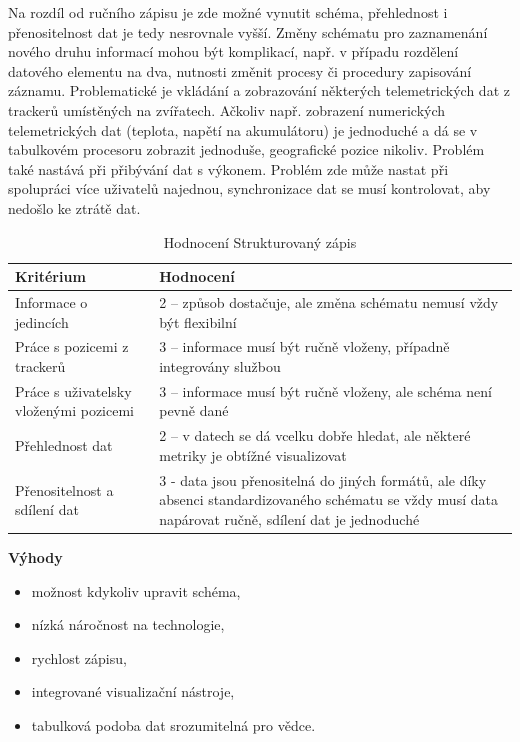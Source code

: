 Na rozdíl od ručního zápisu je zde možné vynutit schéma, přehlednost i přenositelnost dat je tedy nesrovnale vyšší. Změny schématu pro zaznamenání nového druhu informací mohou být komplikací, např. v případu rozdělení datového elementu na dva, nutnosti změnit procesy či procedury zapisování záznamu. Problematické je vkládání a zobrazování některých telemetrických dat z trackerů umístěných na zvířatech. Ačkoliv např. zobrazení numerických telemetrických dat (teplota, napětí na akumulátoru) je jednoduché a dá se v tabulkovém procesoru zobrazit jednoduše, geografické pozice nikoliv. Problém také nastává při přibývání dat s výkonem. Problém zde může nastat při spolupráci více uživatelů najednou, synchronizace dat se musí kontrolovat, aby nedošlo ke ztrátě dat.

\begin{table}[h]
	\begin{tabular}{ | l | l | }
		\hline
		Kritérium                              & Hodnocení \\
		\hline			
		Informace o jedincích                  & 2 -- způsob dostačuje, ale změna schématu nemusí vždy být flexibilní          \\
		Práce s pozicemi z trackerů            & 3 -- informace musí být ručně vloženy, případně integrovány službou          \\
		Práce s uživatelsky vloženými pozicemi & 3 -- informace musí být ručně vloženy, ale schéma není pevně dané          \\
		Přehlednost dat                        & 2 -- v datech se dá vcelku dobře hledat, ale některé metriky je obtížné visualizovat          \\
		Přenositelnost a sdílení dat           & 3 - data jsou přenositelná do jiných formátů, ale díky absenci standardizovaného schématu se vždy musí data napárovat ručně, sdílení dat je jednoduché          \\
		\hline	
	\end{tabular}
	\caption{Hodnocení Strukturovaný zápis}
\end{table}

\textbf{Výhody}

\begin{itemize}
	\item možnost kdykoliv upravit schéma,
	\item nízká náročnost na technologie,
	\item rychlost zápisu,
	\item integrované visualizační nástroje,
	\item tabulková podoba dat srozumitelná pro vědce.
\end{itemize}

